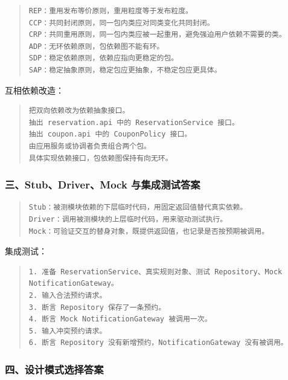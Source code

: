 \documentclass[UTF8,zihao=-4]{ctexart}
\begin{document}
\begin{quote}
\footnotesize
\begin{verbatim}
REP：重用发布等价原则，重用粒度等于发布粒度。
CCP：共同封闭原则，同一包内类应对同类变化共同封闭。
CRP：共同重用原则，同一包内类应被一起重用，避免强迫用户依赖不需要的类。
ADP：无环依赖原则，包依赖图不能有环。
SDP：稳定依赖原则，依赖应指向更稳定的包。
SAP：稳定抽象原则，稳定包应更抽象，不稳定包应更具体。
\end{verbatim}
\end{quote}


互相依赖改造：


\begin{quote}
\footnotesize
\begin{verbatim}
把双向依赖改为依赖抽象接口。
抽出 reservation.api 中的 ReservationService 接口。
抽出 coupon.api 中的 CouponPolicy 接口。
由应用服务或协调者负责组合两个包。
具体实现依赖接口，包依赖图保持有向无环。
\end{verbatim}
\end{quote}


\subsubsection*{三、Stub、Driver、Mock 与集成测试答案}


\begin{quote}
\footnotesize
\begin{verbatim}
Stub：被测模块依赖的下层临时代码，用固定返回值替代真实依赖。
Driver：调用被测模块的上层临时代码，用来驱动测试执行。
Mock：可验证交互的替身对象，既提供返回值，也记录是否按预期被调用。
\end{verbatim}
\end{quote}


集成测试：


\begin{quote}
\footnotesize
\begin{verbatim}
1. 准备 ReservationService、真实规则对象、测试 Repository、Mock NotificationGateway。
2. 输入合法预约请求。
3. 断言 Repository 保存了一条预约。
4. 断言 Mock NotificationGateway 被调用一次。
5. 输入冲突预约请求。
6. 断言 Repository 没有新增预约，NotificationGateway 没有被调用。
\end{verbatim}
\end{quote}


\subsubsection*{四、设计模式选择答案}
\end{document}
